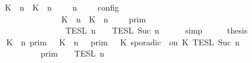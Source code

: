 \begin{isabellebody}
\ \ \isamarkupfalse%
\ \isamarkupfalse%
\ {\isacartoucheopen}{\isasymlbrakk}\ {\isacharparenleft}{\isacharparenleft}K\ {\isasymUp}\ n{\isacharparenright}\ {\isacharhash}\ {\isacharparenleft}K\ {\isasymDown}\ n\ {\isacharat}\ {\isasymtau}{\isacharparenright}\ {\isacharhash}\ {\isasymGamma}{\isacharparenright}{\isacharcomma}\ n\ {\isasymturnstile}\ {\isasymPsi}\ {\isasymtriangleright}\ {\isasymPhi}\ {\isasymrbrakk}\isactrlsub c\isactrlsub o\isactrlsub n\isactrlsub f\isactrlsub i\isactrlsub g\isanewline
\ \ \ \ \ \ \ \ \ \ \ \ \ \ \ \ \ {\isacharequal}\ \ {\isasymlbrakk}{\isasymlbrakk}\ {\isacharparenleft}{\isacharparenleft}K\ {\isasymUp}\ n{\isacharparenright}\ {\isacharhash}\ {\isacharparenleft}K\ {\isasymDown}\ n\ {\isacharat}\ {\isasymtau}{\isacharparenright}\ {\isacharhash}\ {\isasymGamma}{\isacharparenright}\ {\isasymrbrakk}{\isasymrbrakk}\isactrlsub p\isactrlsub r\isactrlsub i\isactrlsub m\isanewline
\ \ \ \ \ \ \ \ \ \ \ \ \ \ \ \ \ \ {\isasyminter}\ {\isasymlbrakk}{\isasymlbrakk}\ {\isasymPsi}\ {\isasymrbrakk}{\isasymrbrakk}\isactrlsub T\isactrlsub E\isactrlsub S\isactrlsub L\isactrlbsup {\isasymge}\ n\isactrlesup \ {\isasyminter}\ {\isasymlbrakk}{\isasymlbrakk}\ {\isasymPhi}\ {\isasymrbrakk}{\isasymrbrakk}\isactrlsub T\isactrlsub E\isactrlsub S\isactrlsub L\isactrlbsup {\isasymge}\ Suc\ n\isactrlesup {\isacartoucheclose}\isanewline
\ \ \ \ \isamarkupfalse%
\ simp\isanewline
\ \ \isamarkupfalse%
\ \isamarkupfalse%
\ {\isacharquery}thesis\isanewline
\ \ \isamarkupfalse%
\ {\isacharminus}\isanewline
\ \ \ \ \isamarkupfalse%
\ {\isacartoucheopen}{\isacharparenleft}{\isasymlbrakk}\ K\ {\isasymUp}\ n\ {\isasymrbrakk}\isactrlsub p\isactrlsub r\isactrlsub i\isactrlsub m\ {\isasyminter}\ {\isasymlbrakk}\ K\ {\isasymDown}\ n\ {\isacharat}\ {\isasymtau}\ {\isasymrbrakk}\isactrlsub p\isactrlsub r\isactrlsub i\isactrlsub m\ {\isasymunion}\ {\isasymlbrakk}\ K\ sporadic\ {\isasymtau}\ on\ K\ {\isasymrbrakk}\isactrlsub T\isactrlsub E\isactrlsub S\isactrlsub L\isactrlbsup {\isasymge}\ Suc\ n\isactrlesup {\isacharparenright}\isanewline
\ \ \ \ \ \ \ \ \ \ \ \ {\isasyminter}\ {\isacharparenleft}{\isasymlbrakk}{\isasymlbrakk}\ {\isasymGamma}\ {\isasymrbrakk}{\isasymrbrakk}\isactrlsub p\isactrlsub r\isactrlsub i\isactrlsub m\ {\isasyminter}\ {\isasymlbrakk}{\isasymlbrakk}\ {\isasymPsi}\ {\isasymrbrakk}{\isasymrbrakk}\isactrlsub T\isactrlsub E\isactrlsub S\isactrlsub L\isactrlbsup {\isasymge}\ n\isactrlesup {\isacharparenright}\isanewline

\end{isabellebody}

